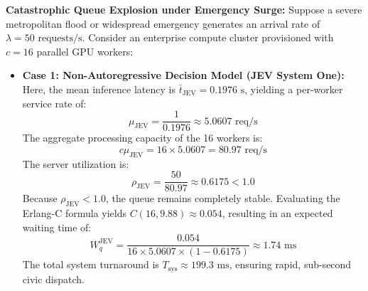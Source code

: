 \documentclass[journal,compsoc]{IEEEtran}
\begin{document}
\noindent\textbf{Catastrophic Queue Explosion under Emergency Surge:}
Suppose a severe metropolitan flood or widespread emergency generates an arrival rate of $\lambda = 50 \text{ requests/s}$. Consider an enterprise compute cluster provisioned with $c = 16$ parallel GPU workers:
\begin{itemize}
    \item \textbf{Case 1: Non-Autoregressive Decision Model (JEV System One):}
    Here, the mean inference latency is $\bar{t}_{\text{JEV}} = 0.1976 \text{ s}$, yielding a per-worker service rate of:
    \begin{equation}
    \mu_{\text{JEV}} = \frac{1}{0.1976} \approx 5.0607 \text{ req/s}
    \end{equation}
    The aggregate processing capacity of the 16 workers is:
    \begin{equation}
    c \mu_{\text{JEV}} = 16 \times 5.0607 = 80.97 \text{ req/s}
    \end{equation}
    The server utilization is:
    \begin{equation}
    \rho_{\text{JEV}} = \frac{50}{80.97} \approx 0.6175 < 1.0
    \end{equation}
    Because $\rho_{\text{JEV}} < 1.0$, the queue remains completely stable. Evaluating the Erlang-C formula yields $C(16, 9.88) \approx 0.054$, resulting in an expected waiting time of:
    \begin{equation}
    W_q^{\text{JEV}} = \frac{0.054}{16 \times 5.0607 \times (1 - 0.6175)} \approx 1.74 \text{ ms}
    \end{equation}
    The total system turnaround is $T_{\text{sys}} \approx 199.3 \text{ ms}$, ensuring rapid, sub-second civic dispatch.
    

\end{itemize}
\end{document}
